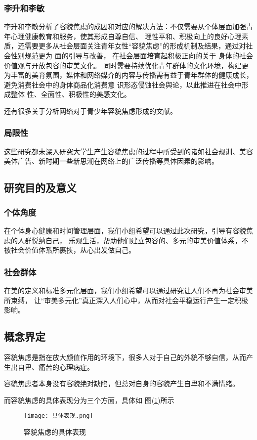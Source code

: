 \subsubsection{李升和李敏}
李升和李敏分析了容貌焦虑的成因和对应的解决方法：不仅需要从个体层面加强青年心理健康教育和服务，使其形成自尊自信、
理性平和、积极向上的良好心理素质，还需要更多从社会层面关注青年女性``容貌焦虑''的形成机制及结果，通过对社会性别规范更为 面的引导与改善，
在社会层面培育起积极正向的关于 身体的社会价值观与开放包容的审美文化。
同时需要持续优化青年群体的文化环境，构建更为丰富的美育氛围，媒体和网络媒介的内容与传播需有益于青年群体的健康成长，避免消费社会中的身体商品化消费意 识形态侵蚀社会舆论，以此推进在社会中形成整体 性、全面性、积极性的美感文化。\autocite{__2022-2}

还有很多关于分析网络对于青少年容貌焦虑形成的文献\autocite{_sisi_2024}。

\subsubsection{局限性}
这些研究都未深入研究大学生产生容貌焦虑的过程中所受到的诸如社会规训、美容美体广告、新时期一些新思潮在网络上的广泛传播等具体因素的影响。

\subsection{研究目的及意义}

\subsubsection{个体角度}
在个体身心健康和时间管理层面，我们小组希望可以通过此次研究，引导有容貌焦虑的人群悦纳自己，
乐观生活，帮助他们建立包容的、多元的审美价值体系，不被社会价值体系所裹挟，从心出发做自己。

\subsubsection{社会群体}
在美的定义和标准多元化层面，我们小组希望可以通过研究让人们不再为社会审美所束缚，
让``审美多元化''真正深入人们心中，从而对社会平稳运行产生一定积极影响。

\subsection{概念界定}
容貌焦虑是指在放大颜值作用的环境下，很多人对于自己的外貌不够自信，从而产生出自卑、痛苦的心理病症。

容貌焦虑者本身没有容貌绝对缺陷，但总对自身的容貌产生自卑和不满情绪。

而容貌焦虑的具体表现分为三个方面，具体如
图(\ref{pic:juti})所示
\begin{figure}[htbp]
    \centering
    \texttt{[image: 具体表现.png]}
    \caption{容貌焦虑的具体表现}
    \label{pic:juti}
\end{figure}


